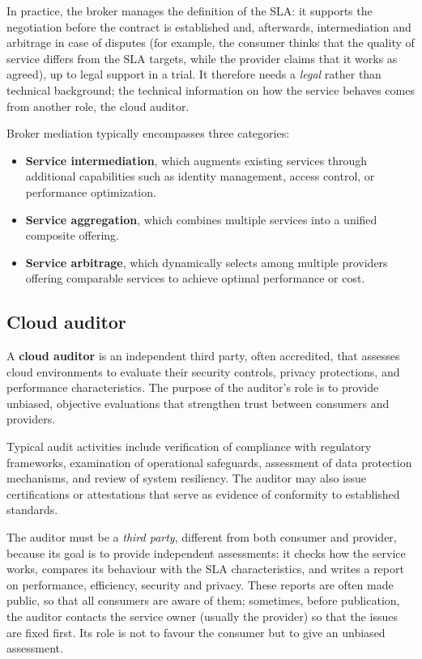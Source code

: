 In practice, the broker manages the definition of the SLA: it supports the negotiation before the contract is established and, afterwards, intermediation and arbitrage in case of disputes (for example, the consumer thinks that the quality of service differs from the SLA targets, while the provider claims that it works as agreed), up to legal support in a trial. It therefore needs a \emph{legal} rather than technical background; the technical information on how the service behaves comes from another role, the cloud auditor.

Broker mediation typically encompasses three categories:

\begin{itemize}
\item \textbf{Service intermediation}, which augments existing services through additional capabilities such as identity management, access control, or performance optimization.
\item \textbf{Service aggregation}, which combines multiple services into a unified composite offering.
\item \textbf{Service arbitrage}, which dynamically selects among multiple providers offering comparable services to achieve optimal performance or cost.
\end{itemize}

\subsection{Cloud auditor}

A \textbf{cloud auditor} is an independent third party, often accredited, that assesses cloud environments to evaluate their security controls, privacy protections, and performance characteristics. The purpose of the auditor's role is to provide unbiased, objective evaluations that strengthen trust between consumers and providers.

Typical audit activities include verification of compliance with regulatory frameworks, examination of operational safeguards, assessment of data protection mechanisms, and review of system resiliency. The auditor may also issue certifications or attestations that serve as evidence of conformity to established standards.

The auditor must be a \emph{third party}, different from both consumer and provider, because its goal is to provide independent assessments: it checks how the service works, compares its behaviour with the SLA characteristics, and writes a report on performance, efficiency, security and privacy. These reports are often made public, so that all consumers are aware of them; sometimes, before publication, the auditor contacts the service owner (usually the provider) so that the issues are fixed first. Its role is not to favour the consumer but to give an unbiased assessment.

